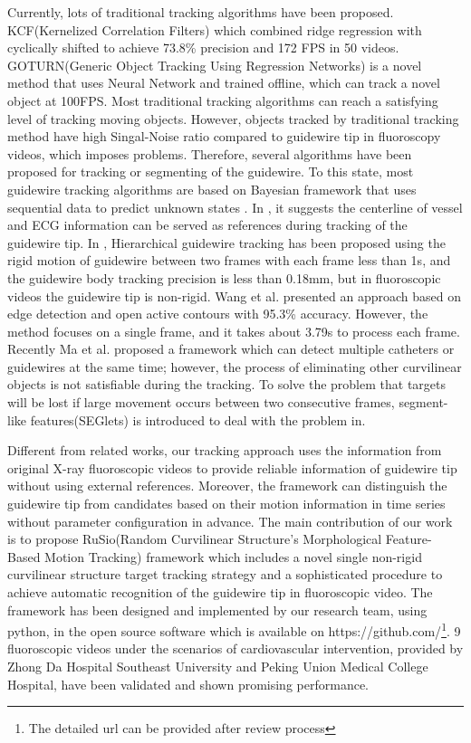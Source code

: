 \documentclass[journal]{IEEEtran}
\begin{document}
Currently, lots of traditional tracking algorithms have been proposed. KCF(Kernelized Correlation Filters) \cite{Henriques2014High} which combined ridge regression with cyclically shifted to achieve 73.8\% precision and 172 FPS in 50 videos. GOTURN(Generic Object Tracking Using Regression Networks)\cite{held2016learning} is a novel method that uses Neural Network and trained offline, which can track a novel object at 100FPS. Most traditional tracking algorithms can reach a satisfying level of tracking moving objects. However, objects tracked by traditional tracking method have high Singal-Noise ratio compared to guidewire tip in fluoroscopy videos, which imposes problems. Therefore, several algorithms have been proposed for tracking or segmenting of the guidewire. To this state, most guidewire tracking algorithms are based on Bayesian framework that uses sequential data to predict unknown states \cite{Isard1998}.
In \cite{bacchuwar2017voidd}, it suggests the centerline of vessel and ECG information can be served as references during tracking of the guidewire tip. 
In \cite{Peng2009Hierarchical}, Hierarchical guidewire tracking has been proposed using the rigid motion of guidewire between two frames with each frame less than 1s, and the guidewire body tracking precision is less than 0.18mm, but in fluoroscopic videos the guidewire tip is non-rigid. Wang et al. \cite{wang2017guide} presented an approach based on edge detection and open active contours with 95.3\% accuracy. However, the method focuses on a single frame, and it takes about 3.79s to process each frame. Recently Ma et al. \cite{ma2018novel} proposed a framework which can detect multiple catheters or guidewires at the same time; however, the process of eliminating other curvilinear objects is not satisfiable during the tracking. To solve the problem that targets will be lost if large movement occurs between two consecutive frames, segment-like features(SEGlets) is introduced to deal with the problem in\cite{vandini2017robust}.

Different from related works, our tracking approach uses the information from original X-ray fluoroscopic videos to provide reliable information of guidewire tip without using external references. Moreover, the framework can distinguish the guidewire tip from candidates based on their motion information in time series without parameter configuration in advance. The main contribution of our work is to propose RuSio(Random Curvilinear Structure's Morphological Feature-Based Motion Tracking) framework which includes a novel single non-rigid curvilinear structure target tracking strategy and a sophisticated procedure to achieve automatic recognition of the guidewire tip in fluoroscopic video. The framework has been designed and implemented by our research team, using python, in the open source software which is available on https://github.com/\footnote{The detailed url can be provided after review process}. 9 fluoroscopic videos under the scenarios of cardiovascular intervention, provided by Zhong Da Hospital Southeast University and Peking Union Medical College Hospital, have been validated and shown promising performance. 
\end{document}
